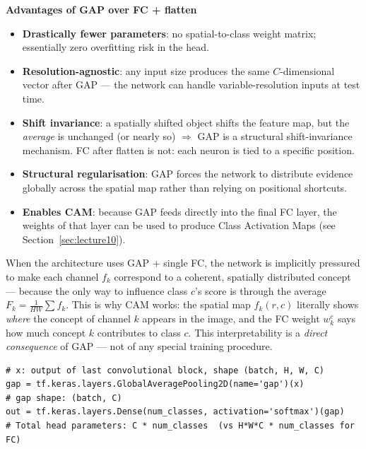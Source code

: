 \documentclass[11pt,a4paper]{article}
\begin{document}
\begin{tcolorbox}[colback=LightBlue,colframe=AccentBlue,boxrule=0.8pt,arc=3pt]
\textbf{Advantages of GAP over FC + flatten}
\begin{itemize}
  \item \textbf{Drastically fewer parameters}: no spatial-to-class weight matrix; essentially zero overfitting risk in the head.
  \item \textbf{Resolution-agnostic}: any input size produces the same $C$-dimensional vector after GAP — the network can handle variable-resolution inputs at test time.
  \item \textbf{Shift invariance}: a spatially shifted object shifts the feature map, but the \emph{average} is unchanged (or nearly so) $\Rightarrow$ GAP is a structural shift-invariance mechanism.  FC after flatten is not: each neuron is tied to a specific position.
  \item \textbf{Structural regularisation}: GAP forces the network to distribute evidence globally across the spatial map rather than relying on positional shortcuts.
  \item \textbf{Enables CAM}: because GAP feeds directly into the final FC layer, the weights of that layer can be used to produce Class Activation Maps (see Section~\ref{sec:lecture10}).
\end{itemize}
\end{tcolorbox}

\begin{insightbox}
When the architecture uses GAP + single FC, the network is implicitly pressured to make each channel $f_k$ correspond to a coherent, spatially distributed concept — because the only way to influence class $c$'s score is through the average $F_k = \frac{1}{HW}\sum f_k$.  This is why CAM works: the spatial map $f_k(r,c)$ literally shows \emph{where} the concept of channel $k$ appears in the image, and the FC weight $w_k^c$ says how much concept $k$ contributes to class $c$.  This interpretability is a \emph{direct consequence} of GAP — not of any special training procedure.
\end{insightbox}

\begin{lstlisting}[caption={GAP + softmax classifier head in Keras (NiN style)}]
# x: output of last convolutional block, shape (batch, H, W, C)
gap = tf.keras.layers.GlobalAveragePooling2D(name='gap')(x)
# gap shape: (batch, C)
out = tf.keras.layers.Dense(num_classes, activation='softmax')(gap)
# Total head parameters: C * num_classes  (vs H*W*C * num_classes for FC)
\end{lstlisting}
\end{document}
